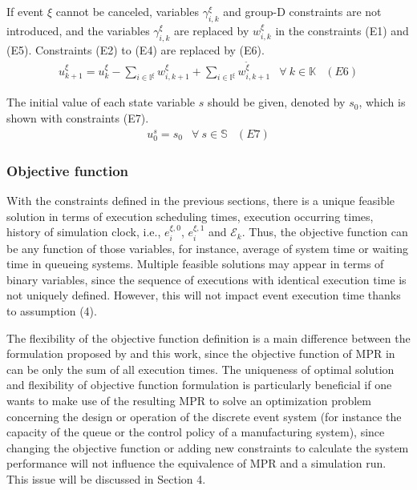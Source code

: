 \documentclass[suppldata]{interact}
\theoremstyle{plain}
\theoremstyle{definition}
\theoremstyle{remark}
\begin{document}
If event ${\xi}$ cannot be canceled, variables $\gamma^{\xi}_{i,k}$ and group-D constraints are not introduced, and the variables $\gamma^{\xi}_{i,k}$ are replaced by $w^{\xi}_{i,k}$ in the constraints (E1) and (E5). Constraints (E2) to (E4) are replaced by (E6).
\begin{eqnarray}
	u^{\xi}_{k+1}= u^{\xi}_{k} - \sum_{i\in \mathbb{I}^{\xi}} w^{\xi}_{i,k+1} + \sum_{i\in \mathbb{I}^{\xi}} w^{\tilde{\xi}}_{i,k+1} & \forall\ k\in \mathbb{K}&(E6)\nonumber
\end{eqnarray}

The initial value of each state variable $s$ should be given, denoted by $s_{0}$, which is shown with constraints (E7).
\begin{eqnarray}
	u^{s}_{0} =  s_0& \forall\ s\in \mathbb{S}&(E7)\nonumber
\end{eqnarray}


\subsubsection{Objective function}\label{sec:obj}
With the constraints defined in the previous sections, there is a unique feasible solution in terms of execution scheduling times, execution occurring times, history of simulation clock, i.e., $e^{\xi,0}_i$, $e^{\xi,1}_{i}$ and $\mathcal{E}_k$. Thus, the objective function can be any function of those variables, for instance, average of system time or waiting time in queueing systems. Multiple feasible solutions may appear in terms of binary variables, since the sequence of executions with identical execution time is not uniquely defined. However, this will not impact event execution time thanks to assumption (4).

The flexibility of the objective function definition is a main difference between the formulation proposed by \cite{chan2008optimization} and this work, since the objective function of MPR in \cite{chan2008optimization} can be only the sum of all execution times. The uniqueness of optimal solution and flexibility of objective function formulation is particularly beneficial if one wants to make use of the resulting MPR to solve an optimization problem concerning the design or operation of the discrete event system (for instance the capacity of the queue or the control policy of a manufacturing system), since changing the objective function or adding new constraints to calculate the system performance will not influence the equivalence of MPR and a simulation run. This issue will be discussed in Section 4.
\end{document}
